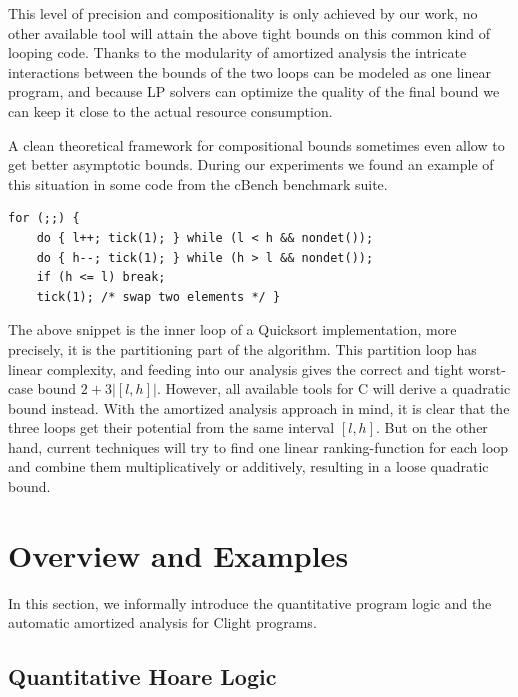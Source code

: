 \documentclass[nocopyrightspace,preprint]{sigplanconf}
\newcommand{\ifshort}[2]{\ifx\fullversion\undefined{#1}\else{#2}\fi}
\newcommand{\sectskip}[0]{\ifshort{\vspace{-3pt}}{}}
\newcommand{\aftersectskip}[0]{\ifshort{\vspace{-1pt}}{}}
\begin{document}
This level of precision and compositionality is only achieved by
our work, no other available tool will attain the above tight bounds
on this common kind of looping code.  Thanks to the modularity of
amortized analysis the intricate interactions between the bounds of
the two loops can be modeled as one linear program, and because LP
solvers can optimize the quality of the final bound we can keep
it close to the actual resource consumption.

A clean theoretical framework for compositional bounds sometimes
even allow to get better asymptotic bounds.  During our experiments
we found an example of this situation in some code from the cBench
benchmark suite.
%
\begin{lstlisting}
for (;;) {
    do { l++; tick(1); } while (l < h && nondet());
    do { h--; tick(1); } while (h > l && nondet());
    if (h <= l) break;
    tick(1); /* swap two elements */ }
\end{lstlisting}
%
The above snippet is the inner loop of a Quicksort implementation, more
precisely, it is the partitioning part of the algorithm.  This partition
loop has linear complexity, and feeding into our analysis gives the
correct and tight worst-case bound $2+3|[l,h]|$.  However, all available
tools for C will derive a quadratic bound instead.  With the amortized
analysis approach in mind, it is clear that the three loops get their
potential from the same interval $[l,h]$.  But on the other hand, current
techniques will try to find one linear ranking-function for each loop
and combine them multiplicatively or additively, resulting in a loose
quadratic bound.
%

\sectskip
\section{Overview and Examples}
\label{sec:inform}
\aftersectskip

In this section, we informally introduce the quantitative program
logic and the automatic amortized analysis for Clight programs.

\subsection{Quantitative Hoare Logic}
\end{document}
